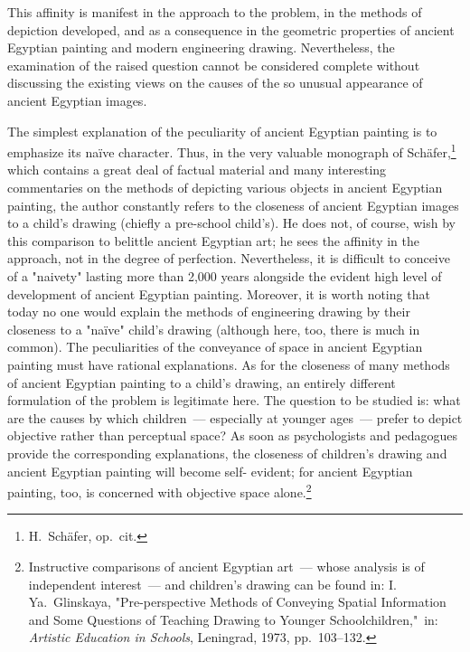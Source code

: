 This affinity is manifest in the approach to the problem, in the methods of depiction
developed, and as a consequence in the geometric properties of ancient Egyptian painting
and modern engineering drawing. Nevertheless, the examination of the raised question
cannot be considered complete without discussing the existing views on the causes of the
so unusual appearance of ancient Egyptian images.

The simplest explanation of the peculiarity of ancient Egyptian painting is to emphasize
its naïve character. Thus, in the very valuable monograph of Schäfer,\footnote{%
  H.~Schäfer, op.~cit.}
which contains a great deal of factual material and many interesting commentaries on
the methods of depicting various objects in ancient Egyptian painting, the author
constantly refers to the closeness of ancient Egyptian images to a child's drawing
(chiefly a pre-school child's). He does not, of course, wish by this comparison to
belittle ancient Egyptian art; he sees the affinity in the approach, not in the degree of
perfection. Nevertheless, it is difficult to conceive of a "naivety" lasting more than
2,000 years alongside the evident high level of development of ancient Egyptian painting.
Moreover, it is worth noting that today no one would explain the methods of engineering
drawing by their closeness to a "naïve" child's drawing (although here, too, there is
much in common). The peculiarities of the conveyance of space in ancient Egyptian
painting must have rational explanations. As for the closeness of many methods of
ancient Egyptian painting to a child's drawing, an entirely different formulation of the
problem is legitimate here. The question to be studied is: what are the causes by which
children~--- especially at younger ages~--- prefer to depict objective rather than perceptual
space? As soon as psychologists and pedagogues provide the corresponding explanations,
the closeness of children's drawing and ancient Egyptian painting will become self-
evident; for ancient Egyptian painting, too, is concerned with objective space
alone.\footnote{%
  Instructive comparisons of ancient Egyptian art~--- whose analysis is of independent
  interest~--- and children's drawing can be found in: I.\,Ya.~Glinskaya, "Pre-perspective
  Methods of Conveying Spatial Information and Some Questions of Teaching Drawing
  to Younger Schoolchildren,"~in: \textit{Artistic Education in Schools}, Leningrad,
  1973, pp.~103--132.}


